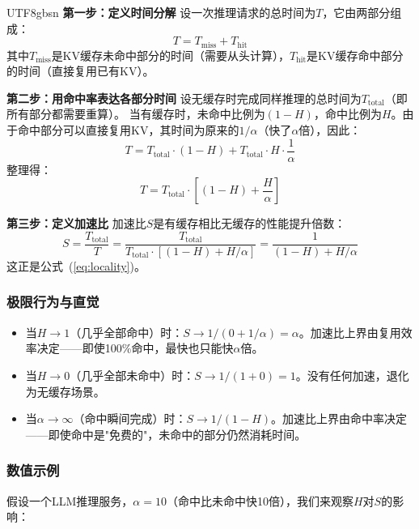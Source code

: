 \documentclass[11pt,a4paper]{article}
\begin{document}
\begin{CJK*}{UTF8}{gbsn}
\textbf{第一步：定义时间分解}
设一次推理请求的总时间为$T$，它由两部分组成：
\begin{equation}
T = T_{\mathrm{miss}} + T_{\mathrm{hit}}
\end{equation}
其中$T_{\mathrm{miss}}$是KV缓存未命中部分的时间（需要从头计算），$T_{\mathrm{hit}}$是KV缓存命中部分的时间（直接复用已有KV）。

\textbf{第二步：用命中率表达各部分时间}
设无缓存时完成同样推理的总时间为$T_{\mathrm{total}}$（即所有部分都需要重算）。
当有缓存时，未命中比例为$(1-H)$，命中比例为$H$。由于命中部分可以直接复用KV，其时间为原来的$1/\alpha$（快了$\alpha$倍），因此：
\begin{equation}
T = T_{\mathrm{total}} \cdot (1-H) + T_{\mathrm{total}} \cdot H \cdot \frac{1}{\alpha}
\end{equation}
整理得：
\begin{equation}
T = T_{\mathrm{total}} \cdot \left[(1-H) + \frac{H}{\alpha}\right]
\end{equation}

\textbf{第三步：定义加速比}
加速比$S$是有缓存相比无缓存的性能提升倍数：
\begin{equation}
S = \frac{T_{\mathrm{total}}}{T} = \frac{T_{\mathrm{total}}}{T_{\mathrm{total}} \cdot \left[(1-H) + H/\alpha\right]} = \frac{1}{(1-H) + H/\alpha}
\end{equation}
这正是公式~(\ref{eq:locality})。

\subsubsection{极限行为与直觉}

\begin{itemize}[nosep]
\item 当$H \to 1$（几乎全部命中）时：$S \to 1/(0 + 1/\alpha) = \alpha$。加速比上界由复用效率决定——即使100\%命中，最快也只能快$\alpha$倍。
\item 当$H \to 0$（几乎全部未命中）时：$S \to 1/(1 + 0) = 1$。没有任何加速，退化为无缓存场景。
\item 当$\alpha \to \infty$（命中瞬间完成）时：$S \to 1/(1-H)$。加速比上界由命中率决定——即使命中是"免费的"，未命中的部分仍然消耗时间。
\end{itemize}

\subsubsection{数值示例}

假设一个LLM推理服务，$\alpha = 10$（命中比未命中快10倍），我们来观察$H$对$S$的影响：


\end{CJK*}
\end{document}
